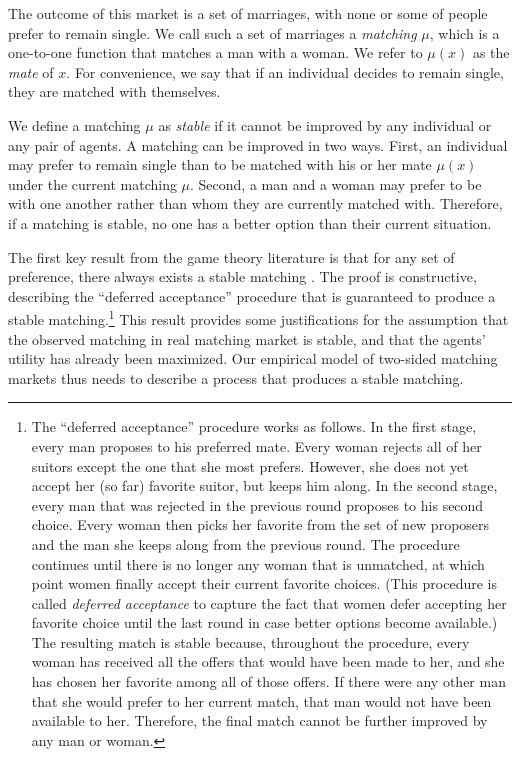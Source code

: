 The outcome of this market is a set of marriages, with none or some of people
prefer to remain single. We call such a set of marriages a \textit{matching}
$\mu$, which is a one-to-one function that matches a man with a woman. We refer
to $\mu(x)$ as the \textit{mate} of $x$. For convenience, we say that if an
individual decides to remain single, they are matched with themselves.

We define a matching $\mu$ as \textit{stable} if it cannot be improved by any
individual or any pair of agents. A matching can be improved in two ways. First,
an individual may prefer to remain single than to be matched with his or her
mate $\mu(x)$ under the current matching $\mu$. Second, a man and a woman may
prefer to be with one another rather than whom they are currently matched with.
Therefore, if a matching is stable, no one has a better option than their
current situation.

The first key result from the game theory literature is that for any set of
preference, there always exists a stable matching \citep{Gale1962}. The proof is
constructive, describing the ``deferred acceptance'' procedure that is
guaranteed to produce a stable matching.\footnote{The ``deferred acceptance''
  procedure works as follows. In the first stage, every man proposes to his
  preferred mate. Every woman rejects all of her suitors except the one that she
  most prefers. However, she does not yet accept her (so far) favorite suitor,
  but keeps him along. In the second stage, every man that was rejected in the
  previous round proposes to his second choice. Every woman then picks her
  favorite from the set of new proposers and the man she keeps along from the
  previous round. The procedure continues until there is no longer any woman
  that is unmatched, at which point women finally accept their current favorite
  choices. (This procedure is called \textit{deferred acceptance} to capture the
  fact that women defer accepting her favorite choice until the last round in
  case better options become available.) The resulting match is stable because,
  throughout the procedure, every woman has received all the offers that would
  have been made to her, and she has chosen her favorite among all of those
  offers. If there were any other man that she would prefer to her current
  match, that man would not have been available to her. Therefore, the final
  match cannot be further improved by any man or woman.} This result provides
some justifications for the assumption that the observed matching in real
matching market is stable, and that the agents' utility has already been
maximized. Our empirical model of two-sided matching markets thus needs to
describe a process that produces a stable matching.

